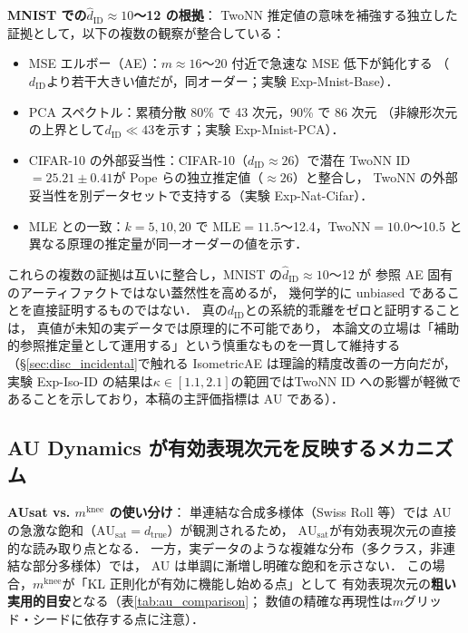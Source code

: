 \documentclass[11pt,a4paper]{jsarticle}
\newcommand{\dtrue}{d_{\mathrm{true}}}
\newcommand{\kap}{\kappa}
\newcommand{\AUsat}{\mathrm{AU}_{\mathrm{sat}}}
\newcommand{\mknee}{m^{\mathrm{knee}}}
\begin{document}
\textbf{MNIST での$\hat{d}_\mathrm{ID} \approx 10$〜12 の根拠}：
TwoNN 推定値の意味を補強する独立した証拠として，以下の複数の観察が整合している：
\begin{itemize}
  \item MSE エルボー（AE）：$m \approx 16$〜20 付近で急速な MSE 低下が鈍化する
        （$d_\mathrm{ID}$より若干大きい値だが，同オーダー；実験 Exp-Mnist-Base）．
  \item PCA スペクトル：累積分散 80\% で 43 次元，90\% で 86 次元
        （非線形次元の上界として$d_\mathrm{ID} \ll 43$を示す；実験 Exp-Mnist-PCA）．
  \item CIFAR-10 の外部妥当性：CIFAR-10（$d_\mathrm{ID} \approx 26$）で潜在 TwoNN ID$=25.21\pm0.41$が
        Pope ら\cite{pope2021intrinsic}の独立推定値（$\approx26$）と整合し，
        TwoNN の外部妥当性を別データセットで支持する（実験 Exp-Nat-Cifar）．
  \item MLE との一致：$k=5,10,20$ で MLE$=11.5$〜12.4，TwoNN$=10.0$〜10.5 と
        異なる原理の推定量が同一オーダーの値を示す．
\end{itemize}
これらの複数の証拠は互いに整合し，MNIST の$\hat{d}_\mathrm{ID} \approx 10$〜12 が
参照 AE 固有のアーティファクトではない蓋然性を高めるが，
幾何学的に unbiased であることを直接証明するものではない．
真の$d_\mathrm{ID}$との系統的乖離をゼロと証明することは，
真値が未知の実データでは原理的に不可能であり，
本論文の立場は「補助的参照推定量として運用する」という慎重なものを一貫して維持する
（§\ref{sec:disc_incidental}で触れる IsometricAE は理論的精度改善の一方向だが，実験 Exp-Iso-ID の結果は$\kap \in [1.1, 2.1]$の範囲ではTwoNN ID への影響が軽微であることを示しており，本稿の主評価指標は AU である）．

\subsection{AU Dynamics が有効表現次元を反映するメカニズム}\label{sec:disc_au_dynamics}

\textbf{AUsat vs. $\mknee$ の使い分け}：
単連結な合成多様体（Swiss Roll 等）では AU の急激な飽和（$\AUsat = \dtrue$）が観測されるため，
$\AUsat$が有効表現次元の直接的な読み取り点となる．
一方，実データのような複雑な分布（多クラス，非連結な部分多様体）では，
AU は単調に漸増し明確な飽和を示さない．
この場合，$\mknee$が「KL 正則化が有効に機能し始める点」として
有効表現次元の\textbf{粗い実用的目安}となる（表\ref{tab:au_comparison}；
数値の精確な再現性は$m$グリッド・シードに依存する点に注意）．
\end{document}
